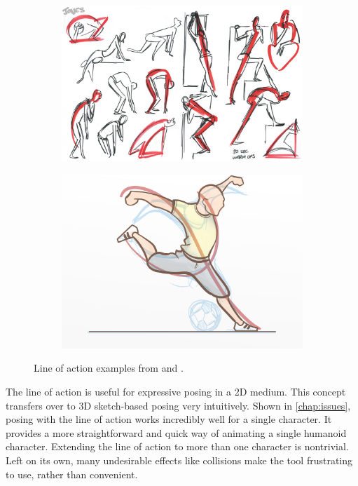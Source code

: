 \begin{figure}[h!]
	\centering
        \begin{subfigure}[b!]{0.45\textwidth}
        	\centering
                \includegraphics[width=\linewidth]{img/cartoon}
                \label{fig:gesture}
        \end{subfigure}
        \quad
        \begin{subfigure}[b!]{0.45\textwidth}
        	\centering
                \includegraphics[width=\linewidth]{img/kick}
                \label{fig:kick}
        \end{subfigure}%
        \caption{Line of action examples from \protect{} and \protect{}.}
	\label{fig:lines}
\end{figure}

The line of action is useful for expressive posing in a 2D medium. This concept transfers over to 3D sketch-based posing very intuitively. Shown in \autoref{chap:issues}, posing with the line of action works incredibly well for a single character. It provides a more straightforward and quick way of animating a single humanoid character. Extending the line of action to more than one character is nontrivial. Left on its own, many undesirable effects like collisions make the tool frustrating to use, rather than convenient. 

